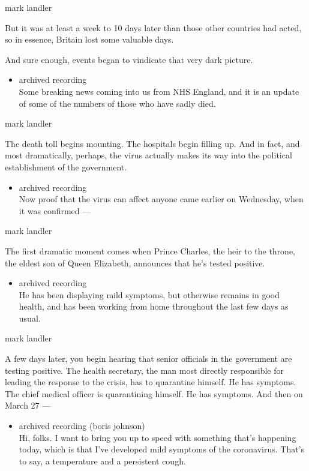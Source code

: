 mark landler

But it was at least a week to 10 days later than those other countries
had acted, so in essence, Britain lost some valuable days.

And sure enough, events began to vindicate that very dark picture.

\begin{itemize}
\tightlist
\item
  archived recording\\
  Some breaking news coming into us from NHS England, and it is an
  update of some of the numbers of those who have sadly died.
\end{itemize}

mark landler

The death toll begins mounting. The hospitals begin filling up. And in
fact, and most dramatically, perhaps, the virus actually makes its way
into the political establishment of the government.

\begin{itemize}
\tightlist
\item
  archived recording\\
  Now proof that the virus can affect anyone came earlier on Wednesday,
  when it was confirmed ---
\end{itemize}

mark landler

The first dramatic moment comes when Prince Charles, the heir to the
throne, the eldest son of Queen Elizabeth, announces that he's tested
positive.

\begin{itemize}
\tightlist
\item
  archived recording\\
  He has been displaying mild symptoms, but otherwise remains in good
  health, and has been working from home throughout the last few days as
  usual.
\end{itemize}

mark landler

A few days later, you begin hearing that senior officials in the
government are testing positive. The health secretary, the man most
directly responsible for leading the response to the crisis, has to
quarantine himself. He has symptoms. The chief medical officer is
quarantining himself. He has symptoms. And then on March 27 ---

\begin{itemize}
\tightlist
\item
  archived recording (boris johnson)\\
  Hi, folks. I want to bring you up to speed with something that's
  happening today, which is that I've developed mild symptoms of the
  coronavirus. That's to say, a temperature and a persistent cough.
\end{itemize}

